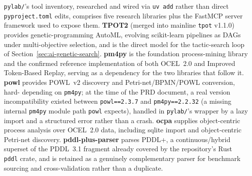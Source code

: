 \texttt{pylab/}'s tool inventory, researched and wired via \texttt{uv
add} rather than direct \texttt{pyproject.toml} edits, comprises five
research libraries plus the FastMCP server framework used to expose
them. \textbf{TPOT2} (merged into mainline \texttt{tpot} v1.1.0)
provides genetic-programming AutoML, evolving scikit-learn pipelines as
DAGs under multi-objective selection, and is the direct model for the
tactic-search loop of Section~\ref{sec:ai-genetic-search}. \textbf{pm4py}
is the foundation process-mining library and the confirmed reference
implementation of both OCEL~2.0 and Improved Token-Based Replay, serving
as a dependency for the two libraries that follow it. \textbf{powl}
provides POWL~v2 discovery and Petri-net/BPMN/POWL conversion, hard-
depending on \texttt{pm4py}; at the time of the PRD document, a real
version incompatibility existed between \texttt{powl==2.3.7} and
\texttt{pm4py==2.2.32} (a missing internal \texttt{pm4py} module path
\texttt{powl} expects), handled in \texttt{pylab/}'s wrapper by a lazy
import and a structured error rather than a crash. \textbf{ocpa}
supplies object-centric process analysis over OCEL~2.0 data, including
sqlite import and object-centric Petri-net discovery. \textbf{pddl-plus-parser}
parses PDDL+, a continuous/hybrid superset of the PDDL~3.1 fragment
already covered by the repository's Rust \texttt{pddl} crate, and is
retained as a genuinely complementary parser for benchmark sourcing and
cross-validation rather than a duplicate.

